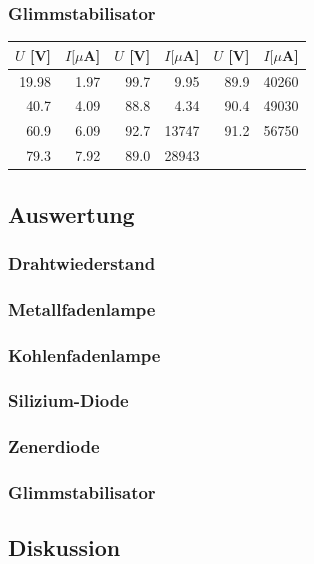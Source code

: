\documentclass[12pt,a4paper]{article}
\begin{document}
\subsubsection*{Glimmstabilisator}
\begin{tabular}{|r|r|r|r|r|r|}
\hline
$U$ [V]&$I [\mu $A]&$U$ [V]&$I [\mu $A]&$U$ [V]&$I [\mu $A]\\
\hline
19.98&1.97&99.7&9.95&89.9&40260\\
40.7&4.09&88.8&4.34&90.4&49030\\
60.9&6.09&92.7&13747&91.2&56750\\
79.3&7.92&89.0&28943&&\\
\hline
\end{tabular}

\subsection*{Auswertung}

\subsubsection*{Drahtwiederstand}

\subsubsection*{Metallfadenlampe}

\subsubsection*{Kohlenfadenlampe}

\subsubsection*{Silizium-Diode}

\subsubsection*{Zenerdiode}

\subsubsection*{Glimmstabilisator}


\subsection*{Diskussion}
\end{document}
